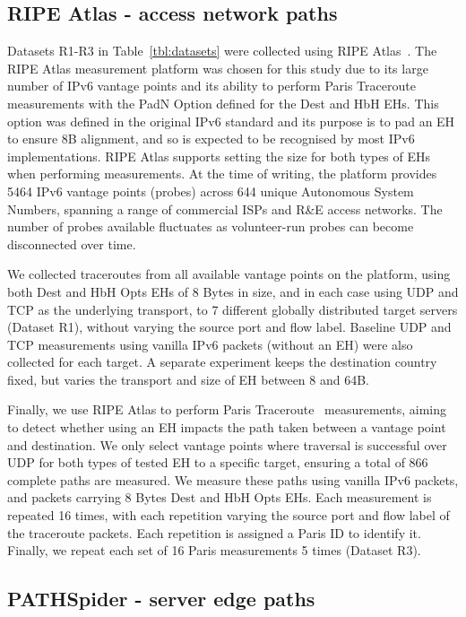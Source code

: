 \documentclass[conference]{IEEEtran}
\begin{document}
    \subsection{RIPE Atlas - access network paths}
    \label{sec:ripe-methodology}

Datasets R1-R3 in Table~\ref{tbl:datasets} were collected using RIPE Atlas~\cite{bajpai2015lessons}.
The RIPE Atlas measurement platform was chosen for this study due to its large number of IPv6 vantage points and its ability to perform Paris Traceroute measurements with the PadN Option defined for the Dest and HbH EHs. This option was defined in the original IPv6 standard and its purpose is to pad an EH to ensure 8B alignment, and so is expected to be recognised by most IPv6 implementations.
RIPE Atlas supports setting the size for both types of EHs when performing measurements. At the time of writing, the platform provides 5464 IPv6 vantage points (probes) across 644 unique Autonomous System Numbers, spanning a range of commercial ISPs and R\&E access networks. The number of probes available fluctuates as volunteer-run probes can become disconnected over time.

We collected traceroutes from all available vantage points on the platform, using both Dest and HbH Opts EHs of 8 Bytes in size, and in each case using UDP and TCP as the underlying transport, to 7 different globally distributed target servers (Dataset R1), without varying the source port and flow label. Baseline UDP and TCP measurements using vanilla IPv6 packets (without an EH) were also collected for each target.
A separate experiment keeps the destination country fixed, but varies the transport and size of EH between 8 and 64B.

Finally, we use RIPE Atlas to perform Paris Traceroute~\cite{augustin2006avoiding} measurements, aiming to detect whether using an EH impacts the path taken between a vantage point and destination. We only select vantage points where traversal is successful over UDP for both types of tested EH to a specific target, ensuring a total of 866 complete paths are measured.
We measure these paths using vanilla IPv6 packets, and packets carrying 8 Bytes Dest and HbH Opts EHs. Each measurement is repeated 16 times, with each repetition varying the source port and flow label of the traceroute packets. Each repetition is assigned a Paris ID to identify it. Finally, we repeat each set of 16 Paris measurements 5 times (Dataset R3).


    \subsection{PATHSpider - server edge paths}
    \label{sec:pathspider-methodology}
\end{document}
